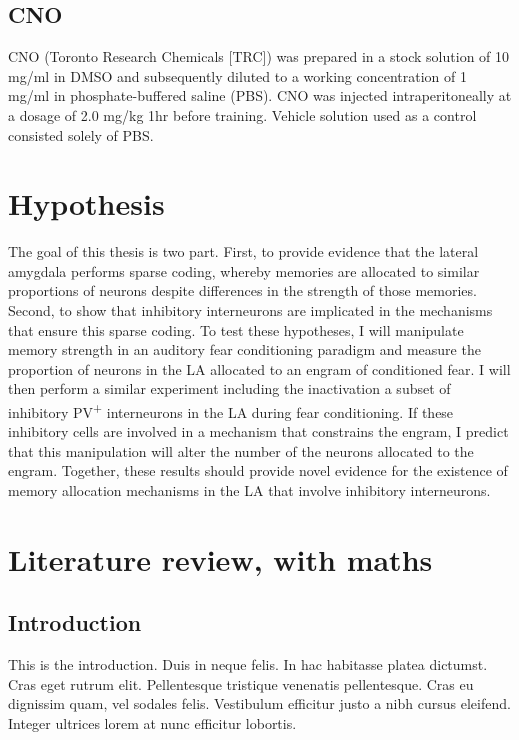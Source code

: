 \documentclass[12pt,a4paperpaper,]{report}
\begin{document}
\section{CNO}\label{cno}

CNO (Toronto Research Chemicals {[}TRC{]}) was prepared in a stock
solution of 10 mg/ml in DMSO and subsequently diluted to a working
concentration of 1 mg/ml in phosphate-buffered saline (PBS). CNO was
injected intraperitoneally at a dosage of 2.0 mg/kg 1hr before training.
Vehicle solution used as a control consisted solely of PBS.  

\chapter{Hypothesis}\label{hypothesis}

The goal of this thesis is two part. First, to provide evidence that the
lateral amygdala performs sparse coding, whereby memories are allocated
to similar proportions of neurons despite differences in the strength of
those memories. Second, to show that inhibitory interneurons are
implicated in the mechanisms that ensure this sparse coding. To test
these hypotheses, I will manipulate memory strength in an auditory fear
conditioning paradigm and measure the proportion of neurons in the LA
allocated to an engram of conditioned fear. I will then perform a
similar experiment including the inactivation a subset of inhibitory
PV\textsuperscript{+} interneurons in the LA during fear conditioning.
If these inhibitory cells are involved in a mechanism that constrains
the engram, I predict that this manipulation will alter the number of
the neurons allocated to the engram. Together, these results should
provide novel evidence for the existence of memory allocation mechanisms
in the LA that involve inhibitory interneurons.

\chapter{Literature review, with
maths}\label{literature-review-with-maths}

\section{Introduction}\label{introduction-1}

This is the introduction. Duis in neque felis. In hac habitasse platea
dictumst. Cras eget rutrum elit. Pellentesque tristique venenatis
pellentesque. Cras eu dignissim quam, vel sodales felis. Vestibulum
efficitur justo a nibh cursus eleifend. Integer ultrices lorem at nunc
efficitur lobortis.
\end{document}
